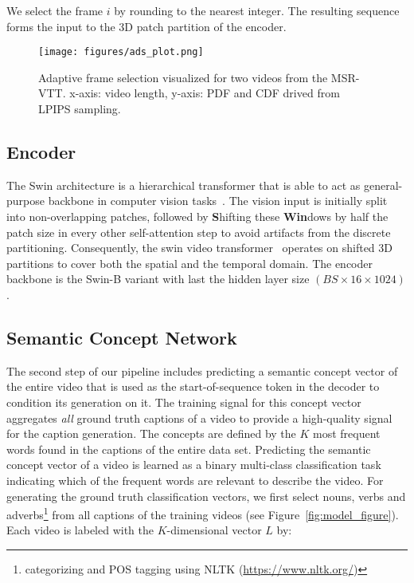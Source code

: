 \documentclass[runningheads,table]{llncs}
\begin{document}
We select the frame $i$ by rounding to the nearest integer.  
The resulting sequence forms the input to the 3D patch partition of the encoder.

\begin{figure}[t]
    \centering
    \texttt{[image: figures/ads\_plot.png]}
     \vspace{-0.3cm}
    \caption{Adaptive frame selection visualized for two videos from the MSR-VTT. x-axis: video length, y-axis: PDF and CDF drived from LPIPS sampling.}\label{fig:adaptive_frame_selection}
\end{figure}



\subsection{Encoder}
The Swin architecture is a hierarchical transformer that is able to act as general-purpose backbone in computer vision tasks~\cite{liu2021swin}. The vision input is initially split into non-overlapping patches, followed by \textbf{S}hifting these \textbf{Win}dows by half the patch size in every other self-attention step to avoid artifacts from the discrete partitioning. Consequently, the swin video transformer~\cite{liu2021video} operates on shifted 3D partitions to cover both the spatial and the temporal domain. The encoder backbone is the Swin-B variant with last the hidden layer size $(BS \times 16 \times 1024)$. 



\subsection{Semantic Concept Network}
The second step of our pipeline includes predicting a semantic concept vector of the entire video that is used as the start-of-sequence token in the decoder to condition its generation on it.
The training signal for this concept vector aggregates \emph{all} ground truth captions of a video to provide a high-quality signal for the caption generation. 
The concepts are defined by the $K$ most frequent words found in the captions of the entire data set.
Predicting the semantic concept vector of a video is learned as a binary multi-class classification task indicating which of the frequent words are relevant to describe the video. 
For generating the ground truth classification vectors, we first select nouns, verbs and adverbs\footnote{categorizing and POS tagging using NLTK (\url{https://www.nltk.org/})} from all captions of the training videos (see Figure~\ref{fig:model_figure}). 
Each video is labeled with the $K$-dimensional vector $L$ by:
\end{document}
